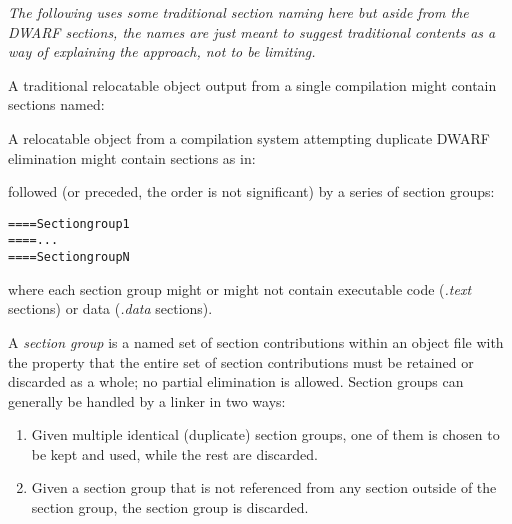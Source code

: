 \textit{The following uses some traditional section naming here
but aside from the DWARF sections, the names are just meant
to suggest traditional contents as a way of explaining the
approach, not to be limiting.}

A traditional relocatable object output 
from a single compilation might contain sections 
named:
\begin{alltt}
\end{alltt}
A relocatable object from a compilation system 
attempting duplicate DWARF elimination might
contain sections as in:

\begin{alltt}
\end{alltt}

followed (or preceded, the order is not significant) 
by a series of section groups:
\begin{alltt}
==== Section group 1
==== ...
==== Section group N
\end{alltt}

where each section group might or might not contain executable
code (\textit{.text} sections) or data (\textit{.data} sections).

A \textit{section group} is a named set of section contributions
within an object file with the property that the entire set
of section contributions must be retained or discarded as a
whole; no partial elimination is allowed. Section groups can
generally be handled by a linker in two ways:

\begin{enumerate}[1.]
\item Given multiple identical (duplicate) section groups,
one of them is chosen to be kept and used, while the rest
are discarded.

\item Given a section group that is not referenced from any
section outside of the section group, the section group
is discarded.


\end{enumerate}


